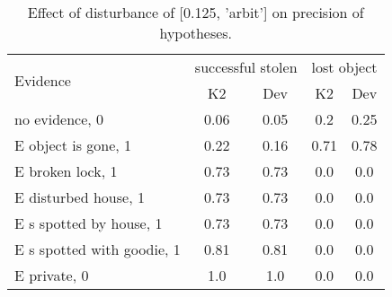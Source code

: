 \begin{table}\begin{tabular}{l|cc|cc}\toprule\multirow{2}{*}{Evidence} & \multicolumn{2}{c}{successful stolen}& \multicolumn{2}{c}{lost object}\\& {K2} & {Dev}& {K2} & {Dev}\\\midrule
no evidence, 0 & 0.06&0.05&0.2&0.25\\E object is gone, 1 & \cellcolor{Bittersweet}0.22&\cellcolor{Bittersweet}0.16&\cellcolor{Bittersweet}0.71&\cellcolor{Bittersweet}0.78\\E broken lock, 1 & 0.73&0.73&0.0&0.0\\E disturbed house, 1 & 0.73&0.73&0.0&0.0\\E s spotted by house, 1 & 0.73&0.73&0.0&0.0\\E s spotted with goodie, 1 & 0.81&0.81&0.0&0.0\\E private, 0 & 1.0&1.0&0.0&0.0\\\bottomrule\end{tabular}\caption{Effect of disturbance of [0.125, 'arbit'] on precision of hypotheses.}\end{table}
